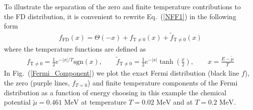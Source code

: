 \documentclass[sn-mathphys,Numbered]{sn-jnl}
\newcommand*{\MeV}{\text{ MeV}}
\newcommand*{\xmagenta}{\color{magenta}}
\begin{document}
To illustrate the separation of the zero and finite temperature contributions to the FD distribution, it is convenient to rewrite Eq.~(\ref{NFF1}) in the following form
\begin{align}\label{Eq_form}
&f_\mathrm{FD}(x)=\Theta(-x)+f_\mathrm{T\neq0}(x)+\tilde f_\mathrm{T\neq0}(x)
\end{align}
where the temperature functions are defined as
\begin{align}
&f_\mathrm{T\neq0}=\frac{1}{2}e^{ -|x|/T }\mathrm{sgn}\left(x\right),\qquad
\tilde f_\mathrm{T\neq0}=\frac{1}{2}e^{ - |x| }\tanh\left(\frac{x}{2}\right),\qquad x=\frac{E-\tilde\mu}{T}
\end{align}
In Fig.~(\ref{Fermi_Component}) we plot the exact Fermi distribution (black line $f$), the zero (purple lines, $f_{T=0}$) and finite temperature components of the Fermi distribution as a function of energy choosing in this example the chemical potential $\widetilde\mu=0.461\MeV$ at temperature $T=0.02\MeV$ and at $T=0.2\MeV$.
\end{document}
